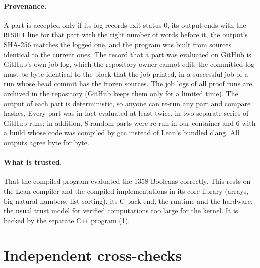 \documentclass[11pt]{article}
\theoremstyle{plain}
\theoremstyle{definition}
\theoremstyle{remark}
\begin{document}
\paragraph{Provenance.} A part is accepted only if its log records exit status $0$, its output ends with
the \texttt{RESULT} line for that part with the right number of words before it, the output's SHA-256
matches the logged one, and the program was built from sources identical to the current ones. The
record that a part was evaluated on GitHub is GitHub's own job log, which the repository owner cannot
edit: the committed log must be byte-identical to the block that the job printed, in a successful job
of a run whose head commit has the frozen sources. The job logs of all proof runs are archived in the
repository (GitHub keeps them only for a limited time). The output of each part is deterministic, so
anyone can re-run any part and compare hashes. Every part was in fact evaluated at least twice, in two
separate series of GitHub runs; in addition, 8 random parts were re-run in our container and 6 with a
build whose code was compiled by gcc instead of Lean's bundled clang. All outputs agree byte for byte.

\paragraph{What is trusted.} That the compiled program evaluated the \num{1358} Booleans correctly. This
rests on the Lean compiler and the compiled implementations in its core library (arrays, big natural
numbers, list sorting), its C back end, the runtime and the hardware: the usual trust model for verified
computations too large for the kernel. It is backed by the separate C\texttt{++} program
(\cref{sec:cross}).

\section{Independent cross-checks}\label{sec:cross}
\end{document}
